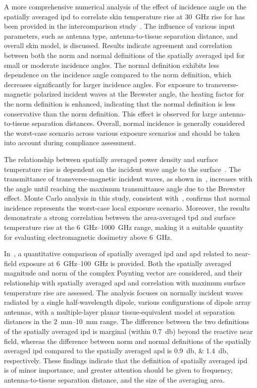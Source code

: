 A more comprehensive numerical analysis of the effect of incidence angle on the spatially averaged \gls{ipd} to correlate skin temperature rise at \SI{30}{\GHz} rise for has been provided in the intercomparison study~\cite{Diao2021Effect}.
The influence of various input parameters, such as antenna type, antenna-to-tissue separation distance, and overall skin model, is discussed.
Results indicate agreement and correlation between both the norm and normal definitions of the spatially averaged \gls{ipd} for small or moderate incidence angles.
The normal definition exhibits less dependence on the incidence angle compared to the norm definition, which decreases significantly for larger incidence angles.
For exposure to transverse-magnetic polarized incident waves at the Brewster angle, the heating factor for the norm definition is enhanced, indicating that the normal definition is less conservative than the norm definition.
This effect is observed for large antenna-to-tissue separation distances.
Overall, normal incidence is generally considered the worst-case scenario across various exposure scenarios and should be taken into account during compliance assessment.

The relationship between spatially averaged power density and surface temperature rise is dependent on the incident wave angle to the surface~\cite{Hirata2021Assessment}.
The transmittance of transverse-magnetic incident waves, as shown in~\cite{Li2019Relationship}, increases with the angle until reaching the maximum transmittance angle due to the Brewster effect.
Monte Carlo analysis in this study, consistent with~\cite{Diao2021Effect}, confirms that normal incidence represents the worst-case local exposure scenario.
Moreover, the results demonstrate a strong correlation between the area-averaged \gls{tpd} and surface temperature rise at the \SIrange{6}{1000}{\GHz} range, making it a suitable quantity for evaluating electromagnetic dosimetry above \SI{6}{\GHz}.

In~\cite{Li2021Quantitative}, a quantitative comparison of spatially averaged \gls{ipd} and \gls{apd} related to near-field exposure at \SIrange{6}{100}{\GHz} is provided.
Both the spatially averaged magnitude and norm of the complex Poynting vector are considered, and their relationship with spatially averaged \gls{apd} and correlation with maximum surface temperature rise are assessed.
The analysis focuses on normally incident waves radiated by a single half-wavelength dipole, various configurations of dipole array antennas, with a multiple-layer planar tissue-equivalent model at separation distances in the \SIrange{2}{10}{\mm} range.
The difference between the two definitions of the spatially averaged \gls{ipd} is marginal (within \SI{0.7}{\decibel}) beyond the reactive near field, whereas the difference between norm and normal definitions of the spatially averaged \gls{ipd} compared to the spatially averaged \gls{apd} is \SIlist{0.9;1.4}{\decibel}, respectively.
These findings indicate that the definition of spatially averaged \gls{ipd} is of minor importance, and greater attention should be given to frequency, antenna-to-tissue separation distance, and the size of the averaging area.

